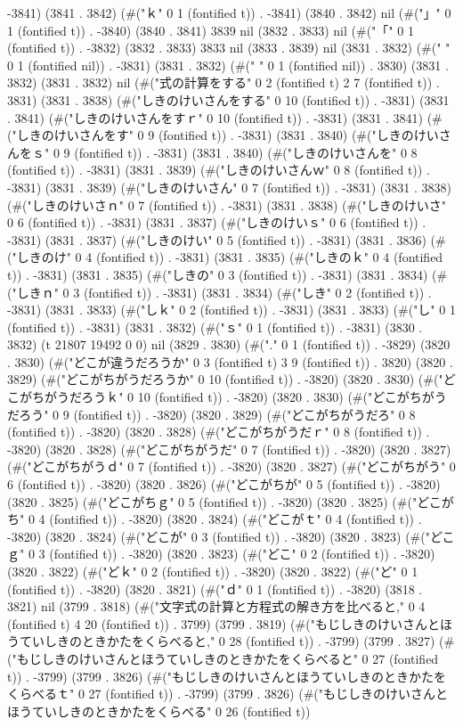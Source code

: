 -3841) (3841 . 3842) (#("ｋ" 0 1 (fontified t)) . -3841) (3840 . 3842) nil (#("」" 0 1 (fontified t)) . -3840) (3840 . 3841) 3839 nil (3832 . 3833) nil (#("「" 0 1 (fontified t)) . -3832) (3832 . 3833) 3833 nil (3833 . 3839) nil (3831 . 3832) (#(" " 0 1 (fontified nil)) . -3831) (3831 . 3832) (#(" " 0 1 (fontified nil)) . 3830) (3831 . 3832) (3831 . 3832) nil (#("式の計算をする" 0 2 (fontified t) 2 7 (fontified t)) . 3831) (3831 . 3838) (#("しきのけいさんをする" 0 10 (fontified t)) . -3831) (3831 . 3841) (#("しきのけいさんをすｒ" 0 10 (fontified t)) . -3831) (3831 . 3841) (#("しきのけいさんをす" 0 9 (fontified t)) . -3831) (3831 . 3840) (#("しきのけいさんをｓ" 0 9 (fontified t)) . -3831) (3831 . 3840) (#("しきのけいさんを" 0 8 (fontified t)) . -3831) (3831 . 3839) (#("しきのけいさんｗ" 0 8 (fontified t)) . -3831) (3831 . 3839) (#("しきのけいさん" 0 7 (fontified t)) . -3831) (3831 . 3838) (#("しきのけいさｎ" 0 7 (fontified t)) . -3831) (3831 . 3838) (#("しきのけいさ" 0 6 (fontified t)) . -3831) (3831 . 3837) (#("しきのけいｓ" 0 6 (fontified t)) . -3831) (3831 . 3837) (#("しきのけい" 0 5 (fontified t)) . -3831) (3831 . 3836) (#("しきのけ" 0 4 (fontified t)) . -3831) (3831 . 3835) (#("しきのｋ" 0 4 (fontified t)) . -3831) (3831 . 3835) (#("しきの" 0 3 (fontified t)) . -3831) (3831 . 3834) (#("しきｎ" 0 3 (fontified t)) . -3831) (3831 . 3834) (#("しき" 0 2 (fontified t)) . -3831) (3831 . 3833) (#("しｋ" 0 2 (fontified t)) . -3831) (3831 . 3833) (#("し" 0 1 (fontified t)) . -3831) (3831 . 3832) (#("ｓ" 0 1 (fontified t)) . -3831) (3830 . 3832) (t 21807 19492 0 0) nil (3829 . 3830) (#("." 0 1 (fontified t)) . -3829) (3820 . 3830) (#("どこが違うだろうか" 0 3 (fontified t) 3 9 (fontified t)) . 3820) (3820 . 3829) (#("どこがちがうだろうか" 0 10 (fontified t)) . -3820) (3820 . 3830) (#("どこがちがうだろうｋ" 0 10 (fontified t)) . -3820) (3820 . 3830) (#("どこがちがうだろう" 0 9 (fontified t)) . -3820) (3820 . 3829) (#("どこがちがうだろ" 0 8 (fontified t)) . -3820) (3820 . 3828) (#("どこがちがうだｒ" 0 8 (fontified t)) . -3820) (3820 . 3828) (#("どこがちがうだ" 0 7 (fontified t)) . -3820) (3820 . 3827) (#("どこがちがうｄ" 0 7 (fontified t)) . -3820) (3820 . 3827) (#("どこがちがう" 0 6 (fontified t)) . -3820) (3820 . 3826) (#("どこがちが" 0 5 (fontified t)) . -3820) (3820 . 3825) (#("どこがちｇ" 0 5 (fontified t)) . -3820) (3820 . 3825) (#("どこがち" 0 4 (fontified t)) . -3820) (3820 . 3824) (#("どこがｔ" 0 4 (fontified t)) . -3820) (3820 . 3824) (#("どこが" 0 3 (fontified t)) . -3820) (3820 . 3823) (#("どこｇ" 0 3 (fontified t)) . -3820) (3820 . 3823) (#("どこ" 0 2 (fontified t)) . -3820) (3820 . 3822) (#("どｋ" 0 2 (fontified t)) . -3820) (3820 . 3822) (#("ど" 0 1 (fontified t)) . -3820) (3820 . 3821) (#("ｄ" 0 1 (fontified t)) . -3820) (3818 . 3821) nil (3799 . 3818) (#("文字式の計算と方程式の解き方を比べると," 0 4 (fontified t) 4 20 (fontified t)) . 3799) (3799 . 3819) (#("もじしきのけいさんとほうていしきのときかたをくらべると," 0 28 (fontified t)) . -3799) (3799 . 3827) (#("もじしきのけいさんとほうていしきのときかたをくらべると" 0 27 (fontified t)) . -3799) (3799 . 3826) (#("もじしきのけいさんとほうていしきのときかたをくらべるｔ" 0 27 (fontified t)) . -3799) (3799 . 3826) (#("もじしきのけいさんとほうていしきのときかたをくらべる" 0 26 (fontified t)) 